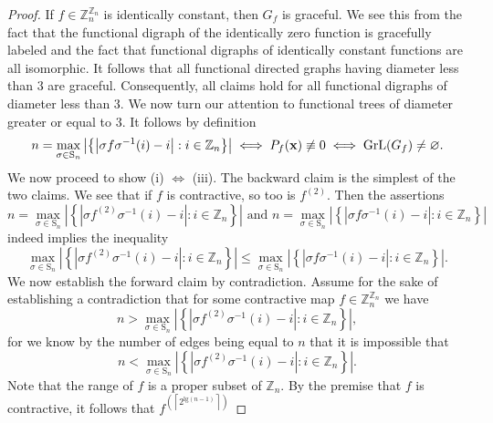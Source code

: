\begin{proof}
If $f\in\mathbb{Z}_{n}^{\mathbb{Z}_{n}}$ is identically constant,
then $G_{f}$ is graceful. We see this from the fact that the functional
digraph of the identically zero function is gracefully labeled and the fact that
functional digraphs of identically constant functions are all isomorphic. It follows
that all functional directed graphs having diameter less than $3$ are graceful. Consequently,
all claims hold for all functional digraphs of diameter less than $3$. We now turn our attention
to functional trees of diameter greater or equal to $3$. 
It follows by definition 
\begin{equation}
n=\max_{\sigma\in\text{S}_{n}}\left|\left\{ \left|\sigma f\sigma^{-1}(i)-i\right|:i\in\mathbb{Z}_{n}\right\} \right| \iff P_{f}({\bf x})\not\equiv0 \iff \text{GrL}(G_f) \neq \varnothing.
\end{equation}
We now proceed to show (i) $\iff$ (iii). The backward claim is the simplest of the two claims. We see
that if $f$ is contractive, so too is $f^{(2)}$. Then the
assertions
\begin{equation}
n=\max_{\sigma\in\text{S}_{n}}\left|\left\{ |\sigma f^{(2)}\sigma^{-1}(i)-i|:i\in\mathbb{Z}_{n}\right\} \right| \text{ and } n=\max_{\sigma\in\text{S}_{n}}\left|\left\{ |\sigma f\sigma^{-1}(i)-i|:i\in\mathbb{Z}_{n}\right\} \right|
\end{equation}
indeed implies the inequality
\begin{equation}
\max_{\sigma\in\text{S}_{n}}\left|\left\{ |\sigma f^{(2)}\sigma^{-1}(i)-i|:i\in\mathbb{Z}_{n}\right\} \right|\le\max_{\sigma\in\text{S}_{n}}\left|\left\{ |\sigma f\sigma^{-1}(i)-i|:i\in\mathbb{Z}_{n}\right\} \right|.
\end{equation}
We now establish the forward claim by contradiction. Assume for the
sake of establishing a contradiction that for some contractive map
$f\in\mathbb{Z}_{n}^{\mathbb{Z}_{n}}$ we have 
\begin{equation}
n>\max_{\sigma\in\text{S}_{n}}\left|\left\{ |\sigma f^{(2)}\sigma^{-1}(i)-i|:i\in\mathbb{Z}_{n}\right\} \right|,
\end{equation}
for we know by the number of edges being equal to $n$ that it is impossible
 that 
\begin{equation}
n<\max_{\sigma\in\text{S}_{n}}\left|\left\{ |\sigma f^{(2)}\sigma^{-1}(i)-i|:i\in\mathbb{Z}_{n}\right\} \right|.
\end{equation}
Note that the range of $f$ is a proper subset of $\mathbb{Z}_{n}$.
By the premise that $f$ is contractive, it follows that $f^{(\left\lceil 2^{\text{lg}(n-1)}\right\rceil )}$

\end{proof}
